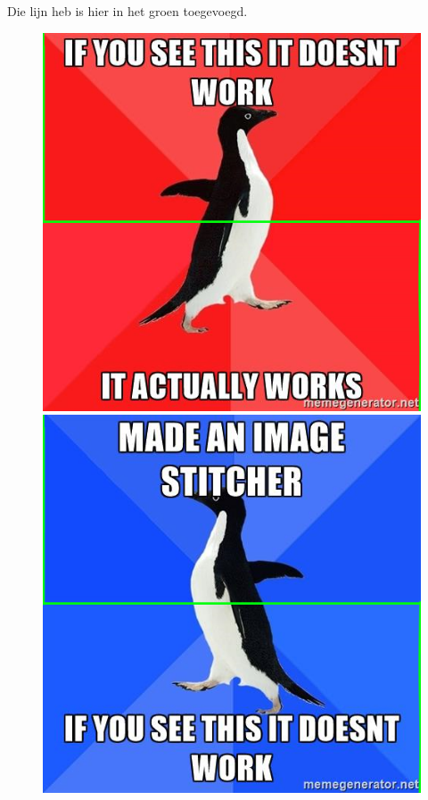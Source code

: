 \documentclass{article}
\begin{document}
Die lijn heb is hier in het groen toegevoegd.
\begin{figure}[h!]
\centering
\includegraphics[scale=0.2]{../myexamples/meme1a.png}
\includegraphics[scale=0.2]{../myexamples/meme2a.png}

\end{figure}
\end{document}
